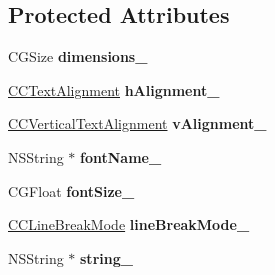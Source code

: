 \subsection*{Protected Attributes}
\begin{DoxyCompactItemize}
\item 
\hypertarget{class_c_c_label_t_t_f_aa764395106d48bb931d983b82adaeedc}{C\-G\-Size {\bfseries dimensions\-\_\-}}\label{class_c_c_label_t_t_f_aa764395106d48bb931d983b82adaeedc}

\item 
\hypertarget{class_c_c_label_t_t_f_ab4980f38cddb57b2329d8a2f932a561b}{\hyperlink{cc_types_8h_aa56b958f0cc9bdec20a15ed6bea3d0f1}{C\-C\-Text\-Alignment} {\bfseries h\-Alignment\-\_\-}}\label{class_c_c_label_t_t_f_ab4980f38cddb57b2329d8a2f932a561b}

\item 
\hypertarget{class_c_c_label_t_t_f_a654fdfedf9e0309ceb2449902fcdae18}{\hyperlink{cc_types_8h_a7ec81bc3a093bf8c36b996174d97dda3}{C\-C\-Vertical\-Text\-Alignment} {\bfseries v\-Alignment\-\_\-}}\label{class_c_c_label_t_t_f_a654fdfedf9e0309ceb2449902fcdae18}

\item 
\hypertarget{class_c_c_label_t_t_f_a22f5d869e1678e9762d80fff23b87f7d}{N\-S\-String $\ast$ {\bfseries font\-Name\-\_\-}}\label{class_c_c_label_t_t_f_a22f5d869e1678e9762d80fff23b87f7d}

\item 
\hypertarget{class_c_c_label_t_t_f_a9a83c11d6df7fdf2e2cdcbc45bdd0327}{C\-G\-Float {\bfseries font\-Size\-\_\-}}\label{class_c_c_label_t_t_f_a9a83c11d6df7fdf2e2cdcbc45bdd0327}

\item 
\hypertarget{class_c_c_label_t_t_f_a4ac45fdeb3ceb243bccd11c6ebe52623}{\hyperlink{cc_types_8h_a08acef9a1b6541728d486ff7eae99e91}{C\-C\-Line\-Break\-Mode} {\bfseries line\-Break\-Mode\-\_\-}}\label{class_c_c_label_t_t_f_a4ac45fdeb3ceb243bccd11c6ebe52623}

\item 
\hypertarget{class_c_c_label_t_t_f_ac532710e7e9ad1eed935ea7676824f77}{N\-S\-String $\ast$ {\bfseries string\-\_\-}}\label{class_c_c_label_t_t_f_ac532710e7e9ad1eed935ea7676824f77}

\end{DoxyCompactItemize}
